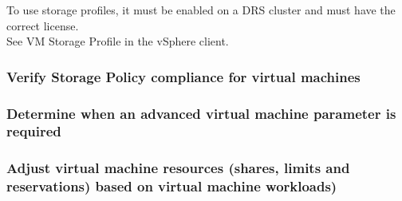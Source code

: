 To use storage profiles, it must be enabled on a DRS cluster and must
have the correct license.\\

See VM Storage Profile in the vSphere client.

\subsubsection{Verify Storage Policy compliance for virtual machines}

\subsubsection{Determine when an advanced virtual machine parameter is required}

\subsubsection{Adjust virtual machine resources (shares, limits and reservations) based on virtual machine workloads)}
